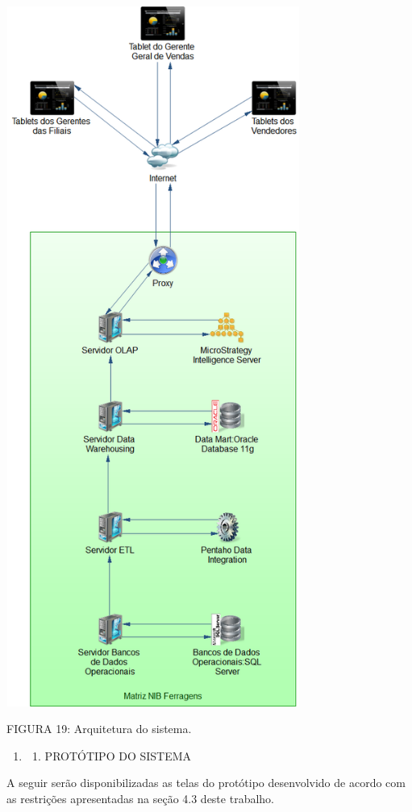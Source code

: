 \documentclass[a4paper]{article}
\newcounter{saveenum}
\newcommand\liststyleWWviiiNumi{%
\renewcommand\theenumi{\arabic{enumi}}
\renewcommand\theenumii{\arabic{enumi}.\arabic{enumii}}
\renewcommand\theenumiii{\arabic{enumi}.\arabic{enumii}.\arabic{enumiii}}
\renewcommand\theenumiv{\arabic{enumi}.\arabic{enumii}.\arabic{enumiii}.\arabic{enumiv}}
\renewcommand\labelenumi{\theenumi}
\renewcommand\labelenumii{\theenumii}
\renewcommand\labelenumiii{\theenumiii}
\renewcommand\labelenumiv{\theenumiv.}
}
\begin{document}
 \includegraphics[width=9.617cm,height=22.983cm]{monograph-img019.png} 

{
\textsf{\MakeUppercase{FIGURA 19}}\textsf{: Arquitetura do sistema.}}

\liststyleWWviiiNumi
\setcounter{saveenum}{\value{enumi}}
\begin{enumerate}
\setcounter{enumi}{\value{saveenum}}
\item \setcounter{saveenum}{\value{enumii}}
\begin{enumerate}
\setcounter{enumii}{\value{saveenum}}
\item {\sffamily
PROT\'OTIPO DO SISTEMA}
\end{enumerate}
\end{enumerate}
{
\textsf{A seguir ser\~ao disponibilizadas as telas do prot\'otipo desenvolvido de acordo com as restri\c{c}\~oes
apresentadas na se\c{c}\~ao 4.3 deste trabalho.}}
\end{document}
